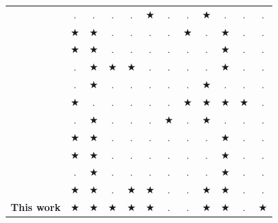 \documentclass[preprint,authoryear]{elsarticle}
\begin{document}
\begin{table}[H]
\begin{tabular}{r|ccc|cc|cc|ccc|c}
		\cite{kaspi2019}            & $.$        & $.$         & $.$       & $.$      &$\bigstar$& $.$      & $.$      &$\bigstar$ & $.$        &  $.$       &  $.$ \\
		
		\cite{RoesenerHall2014}     & $\bigstar$ & $\bigstar$  & $.$       & $.$      & $.$      & $.$      &$\bigstar$& $.$       & $\bigstar$ &  $.$       &  $.$ \\
		\cite{Vancroonemburg2014}   & $\bigstar$ & $\bigstar$  & $.$       & $.$      & $.$      & $.$      & $.$      & $.$       & $\bigstar$ &  $.$       &  $.$ \\
		\cite{LurkinSchyns2015}     & $.$        & $\bigstar$  & $\bigstar$&$\bigstar$& $.$      & $.$      & $.$      & $.$       & $\bigstar$ &  $.$       &  $.$ \\
		\cite{RoesenerBarnes2016}   & $.$        & $\bigstar$  & $.$       & $.$      & $.$      & $.$      & $.$      & $\bigstar$& $.$        &  $.$       &  $.$ \\
		
		\cite{PaquaySchynsLimbourg2016,PaquayLimbourgSchynsOliveira2018}&$\bigstar$&$.$&$.$&$.$&$.$&$.$     &$\bigstar$&$\bigstar$ & $\bigstar$&$\bigstar$  &  $.$ \\
		
		\cite{YangLiuGao2018}       & $.$        & $\bigstar$  & $.$       & $.$      & $.$      &$\bigstar$& $.$      & $\bigstar$ & $.$       & $.$        &  $.$ \\
		\cite{wong2020}             & $\bigstar$ & $\bigstar$  & $.$       & $.$      & $.$      & $.$      & $.$      & $.$        & $\bigstar$& $.$        &  $.$  \\
		\cite{eugene2021}           & $\bigstar$ & $\bigstar$  & $.$       & $.$      & $.$      & $.$      & $.$      & $.$        & $\bigstar$& $.$        &  $.$  \\
		\cite{zhao2021}             & $.$        & $\bigstar$  & $.$       & $.$      & $.$      & $.$      & $.$      & $.$        & $\bigstar$&  $.$       &  $.$ \\
		
		\cite{MesquitaSanches2023}  & $\bigstar$ & $\bigstar$  & $.$       &$\bigstar$&$\bigstar$& $.$      & $.$      & $\bigstar$ & $\bigstar$&  $.$       &  $.$  \\
		
		{\bf This work}             & $\bigstar$ & $\bigstar$  &$\bigstar$ &$\bigstar$&$\bigstar$& $.$      & $.$      & $\bigstar$ & $\bigstar$&  $.$       &  $\bigstar$  \\
		\bottomrule 
	\end{tabular}
	\normalsize 
\end{table}
\end{document}
